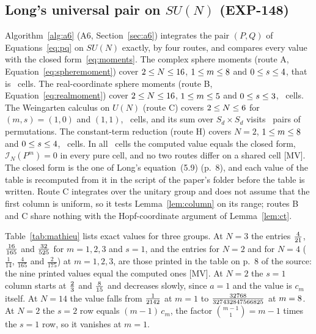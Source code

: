 \documentclass[11pt]{article}
\theoremstyle{remark}
\begin{document}
\subsection{Long's universal pair on \texorpdfstring{$SU(N)$}{SU(N)} (EXP-148)}\label{sec:mathieuexp}

Algorithm~\ref{alg:a6} (A6, Section~\ref{sec:a6}) integrates the pair $(P,Q)$ of Equations~\eqref{eq:pq} on $SU(N)$ exactly, by four routes, and compares every value with the closed form~\eqref{eq:moments}. The complex sphere moments (route A, Equation~\eqref{eq:spheremoment}) cover $2\le N\le16$, $1\le m\le8$ and $0\le s\le4$, that is \nmccellsA\ cells. The real-coordinate sphere moments (route B, Equation~\eqref{eq:realmoment}) cover $2\le N\le16$, $1\le m\le5$ and $0\le s\le3$, \nmccellsB\ cells. The Weingarten calculus on $U(N)$ (route C) covers $2\le N\le6$ for $(m,s)=(1,0)$ and $(1,1)$, \nmccellsC\ cells, and its sum over $S_d\times S_d$ visits \nmcpairs\ pairs of permutations. The constant-term reduction (route H) covers $N=2$, $1\le m\le8$ and $0\le s\le4$, \nmccellsH\ cells. In all \nmccells\ cells the computed value equals the closed form, $\mathcal I_N(P^m)=0$ in every pure cell, and no two routes differ on a shared cell [MV]. The closed form is the one of Long's equation~(5.9) (p.~8), and each value of the table is recomputed from it in the script of the paper's folder before the table is written. Route C integrates over the unitary group and does not assume that the first column is uniform, so it tests Lemma~\ref{lem:column} on its range; routes B and C share nothing with the Hopf-coordinate argument of Lemma~\ref{lem:ct}.



Table~\ref{tab:mathieu} lists exact values for three groups. At $N=3$ the entries $\tfrac{4}{21}$, $\tfrac{16}{165}$ and $\tfrac{32}{525}$ for $m=1,2,3$ and $s=1$, and the entries for $N=2$ and for $N=4$ ($\tfrac1{14}$, $\tfrac4{165}$ and $\tfrac2{175}$) at $m=1,2,3$, are those printed in the table on p.~8 of the source: the nine printed values equal the computed ones [MV]. At $N=2$ the $s=1$ column starts at $\tfrac{2}{3}$ and $\tfrac{8}{15}$ and decreases slowly, since $a=1$ and the value is $c_m$ itself. At $N=14$ the value falls from $\tfrac{1}{2142}$ at $m=1$ to $\tfrac{32768}{327432847566825}$ at $m=8$. At $N=2$ the $s=2$ row equals $(m-1)\,c_m$, the factor $\binom{m-1}{1}=m-1$ times the $s=1$ row, so it vanishes at $m=1$.
\end{document}
